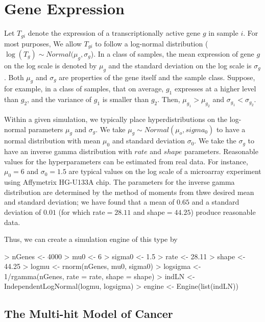 \documentclass[11pt]{article}
\begin{document}
\section{Gene Expression}

Let $T_{gi}$ denote the expression of a transcriptionally active gene
$g$ in sample $i$.  For most purposes, We allow $T_{gi}$ to follow a
log-normal distribution ($\log(T_g) \sim Normal(\mu_g,\sigma_g$).  In a
class of samples, the mean expression of gene $g$ on the log scale is
denoted by $\mu_g$ and the standard deviation on the log scale is
$\sigma_g$.  Both $\mu_g$ and $\sigma_g$ are properties of the gene
itself and the sample class.  Suppose, for example, in a class of
samples, that on average, $g_1$ expresses at a higher level than
$g_2$, and the variance of $g_1$ is smaller than $g_2$. Then,
$\mu_{g_1} > \mu_{g_2}$ and $\sigma_{g_1} < \sigma_{g_2}$.

Within a given simulation, we typically place hyperdistributions on
the log-normal parameters $\mu_g$ and $\sigma_g$.  We take $\mu_g \sim
Normal(\mu_o, sigma_0)$ to have a normal distribution with mean
$\mu_0$ and standard deviation $\sigma_0$. We take the $\sigma_g$ to
have an inverse gamma distribution with $rate$ and $shape$ parameters.
Reasonable values for the hyperparameters can be estimated from real
data.  For instance, $\mu_0=6$ and $\sigma_0=1.5$ are typical values
on the log scale of a microarray experiment using Affymetrix HG-U133A
chip.  The parameters for the inverse gamma distribution are
determined by the method of moments from thwe desired mean and
standard deviation; we have found that a mean of $0.65$ and a standard
deviation of $0.01$ (for which rate$ = 28.11$ and shape$ = 44.25$)
produce reasonable data.

Thus, we can create a simulation engine of this type by
\begin{Schunk}
\begin{Sinput}
> nGenes <- 4000
> mu0 <- 6
> sigma0 <- 1.5
> rate <- 28.11
> shape <- 44.25
> logmu <- rnorm(nGenes, mu0, sigma0)
> logsigma <- 1/rgamma(nGenes, rate = rate, shape = shape)
> indLN <- IndependentLogNormal(logmu, logsigma)
> engine <- Engine(list(indLN))
\end{Sinput}
\end{Schunk}

\subsection{The Multi-hit Model of Cancer}
\end{document}
